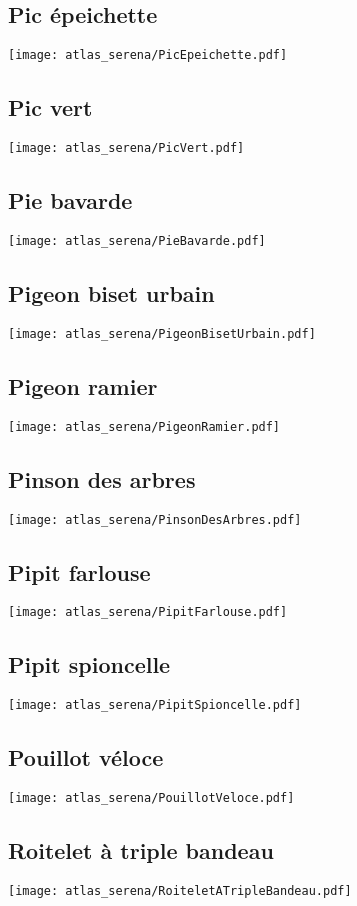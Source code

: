 \subsection{Pic épeichette}
\texttt{[image: atlas\_serena/PicEpeichette.pdf]}
\subsection{Pic vert}
\texttt{[image: atlas\_serena/PicVert.pdf]}
\subsection{Pie bavarde}
\texttt{[image: atlas\_serena/PieBavarde.pdf]}
\subsection{Pigeon biset urbain}
\texttt{[image: atlas\_serena/PigeonBisetUrbain.pdf]}
\subsection{Pigeon ramier}
\texttt{[image: atlas\_serena/PigeonRamier.pdf]}
\subsection{Pinson des arbres}
\texttt{[image: atlas\_serena/PinsonDesArbres.pdf]}
\subsection{Pipit farlouse}
\texttt{[image: atlas\_serena/PipitFarlouse.pdf]}
\subsection{Pipit spioncelle}
\texttt{[image: atlas\_serena/PipitSpioncelle.pdf]}
\subsection{Pouillot véloce}
\texttt{[image: atlas\_serena/PouillotVeloce.pdf]}
\subsection{Roitelet à triple bandeau}
\texttt{[image: atlas\_serena/RoiteletATripleBandeau.pdf]}
